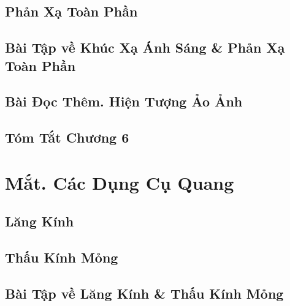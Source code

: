 \documentclass[oneside]{book}
\numberwithin{equation}{section}
\begin{document}

\section{Phản Xạ Toàn Phần}


\section{Bài Tập về Khúc Xạ Ánh Sáng \& Phản Xạ Toàn Phần}


\section{Bài Đọc Thêm. Hiện Tượng Ảo Ảnh}


\section{Tóm Tắt Chương 6}


\chapter{Mắt. Các Dụng Cụ Quang}

\section{Lăng Kính}


\section{Thấu Kính Mỏng}


\section{Bài Tập về Lăng Kính \& Thấu Kính Mỏng}
\end{document}
